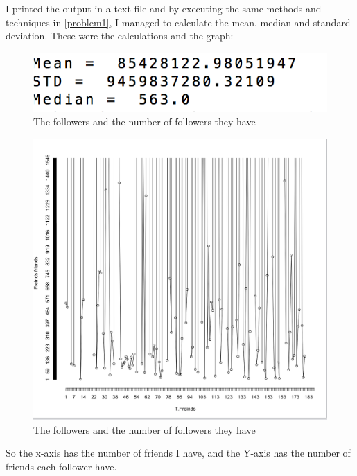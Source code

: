 \documentclass{article}
\begin{document}
I printed the output in a text file and by executing the same methods and techniques in \ref{problem1}, I managed to calculate the mean, median and standard deviation. These were the calculations and the graph:

\begin{figure}
\centering
\includegraphics[scale=0.95]{fig2.png}
\caption{The followers and the number of followers they have}
\label{fig:fig.png}
\end{figure}

\begin{figure}
\centering
\includegraphics[scale=0.25]{last.png}
\caption{The followers and the number of followers they have}
\label{fig:fig.png}
\end{figure}

So the x-axis has the number of friends I have, and the Y-axis has the number of friends each follower have.
\end{document}
